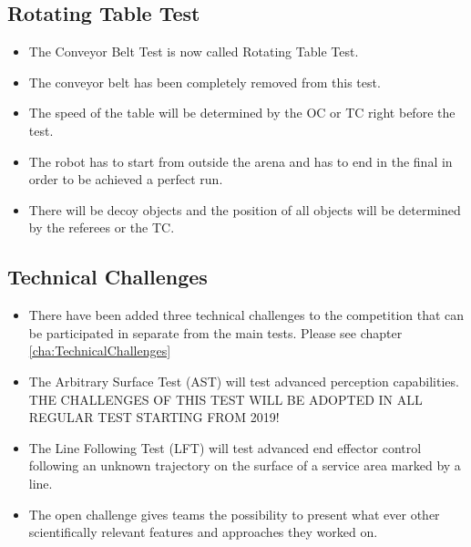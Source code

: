 \subsection{Rotating Table Test}
\begin{itemize}
  \item The Conveyor Belt Test is now called Rotating Table Test.
  \item The conveyor belt has been completely removed from this test.
  \item The speed of the table will be determined by the OC or TC right before the test.
  \item The robot has to start from outside the arena and has to end in the final in order to be achieved a perfect run.
  \item There will be decoy objects and the position of all objects will be determined by the referees or the TC.
\end{itemize}

\subsection{Technical Challenges}
\begin{itemize}
  \item There have been added three technical challenges to the competition that can be participated in separate from the main tests. Please see chapter \ref{cha:TechnicalChallenges}
  \item The Arbitrary Surface Test (AST) will test advanced perception capabilities. THE CHALLENGES OF THIS TEST WILL BE ADOPTED IN ALL REGULAR TEST STARTING FROM 2019!
  \item The Line Following Test (LFT) will test advanced end effector control following an unknown trajectory on the surface of a service area marked by a line.
  \item The open challenge gives teams the possibility to present what ever other scientifically relevant features and approaches they worked on.
\end{itemize}

